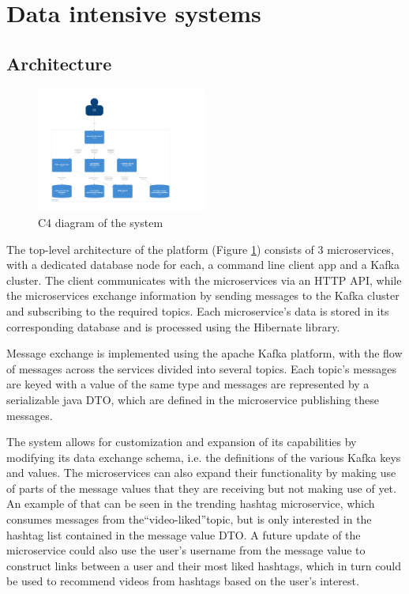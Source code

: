 \documentclass[parskip=full]{article}
\begin{document}
    \tableofcontents
    \pagebreak
    \section{Data intensive systems}
    \subsection{Architecture}
    \begin{figure}
    \includegraphics[width=0.5\textwidth]{c4-diagram-top-level}
    \caption{C4 diagram of the system}
    \label{fig:c4Diagram}
    \end{figure}

    The top-level architecture of the platform (Figure \ref{fig:c4Diagram}) consists of 3 microservices, with a dedicated database node for each, a command line client app and a Kafka cluster.
    The client communicates with the microservices via an HTTP API, while the microservices exchange information by sending messages to the Kafka cluster and subscribing to the required topics.
    Each microservice's data is stored in its corresponding database and is processed using the Hibernate library.

    Message exchange is implemented using the apache Kafka platform, with the flow of messages across the services divided into several topics.
    Each topic's messages are keyed with a value of the same type and messages are represented by a serializable java DTO, which are defined in the microservice publishing these messages.

    The system allows for customization and expansion of its capabilities by modifying its data exchange schema, i.e. the definitions of the various Kafka keys and values.
    The microservices can also expand their functionality by making use of parts of the message values that they are receiving but not making use of yet.
    An example of that can be seen in the trending hashtag microservice, which consumes messages from the``video-liked''topic, but is only interested in the hashtag list contained in the message value DTO. A future update of the microservice could also use the user's username from the message value to construct links between a user and their most liked hashtags, which in turn could be used to recommend videos from hashtags based on the user's interest.
\end{document}
